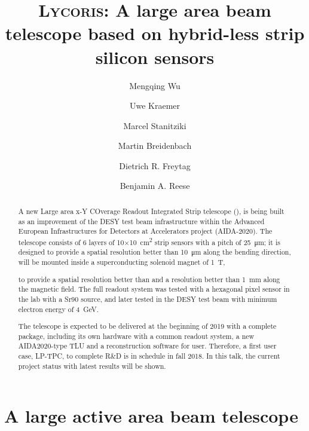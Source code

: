 



\title{\textsc{Lycoris}: A large area beam telescope based on hybrid-less strip silicon sensors}
\author[*]{Mengqing Wu}
\author[*]{Uwe Kraemer}
\author[*]{Marcel Stanitziki}
\author[**]{Martin Breidenbach}
\author[**]{Dietrich R. Freytag}
\author[**]{Benjamin A. Reese}

\maketitle

\begin{abstract}

A new Large area x-Y COverage Readout Integrated Strip telescope (\lycoris),
is being built as an improvement of the DESY test beam infrastructure within the Advanced European Infrastructures for Detectors at Accelerators project (AIDA-2020).
The \lycoris telescope consists of 6 layers of 10$\times$\SI{10}{\square\centi\metre} strip sensors with a pitch of \SI{25}{\micro\metre};
it is designed to provide a spatial resolution better than \SI{10}{\micro\metre} along the bending direction,
will be mounted inside a superconducting solenoid magnet of \SI{1}{\tesla},

to provide a spatial resolution better than
and a resolution better than \SI{1}{\milli\meter} along the magnetic field.
The full readout system was tested with a hexagonal pixel sensor in the lab with a Sr90 source,
and later tested in the DESY test beam with minimum electron energy of \SI{4}{\GeV}.

The telescope is expected to be delivered at the beginning of 2019 with a complete package,
including its own hardware with a common readout system, a new AIDA2020-type TLU and a reconstruction software for user.
Therefore, a first user case, LP-TPC, to complete R&D is in schedule in fall 2018. In this talk, the current project status with latest results will be shown.

\end{abstract}

\section*{A large active area beam telescope}


